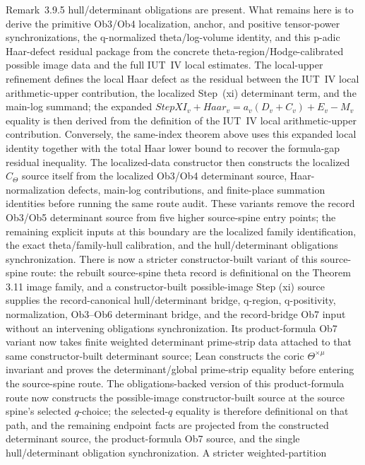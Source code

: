 \documentclass[11pt]{article}
\theoremstyle{plain}
\theoremstyle{definition}
\theoremstyle{remark}
\begin{document}
Remark~3.9.5 hull/determinant obligations are present.
What remains here is to derive the primitive Ob3/Ob4 localization,
anchor, and positive tensor-power synchronizations, the q-normalized
theta/log-volume identity, and this p-adic Haar-defect residual package from
the concrete theta-region/Hodge-calibrated possible image data and the full
IUT~IV local estimates.
The
local-upper refinement defines the local Haar defect as the residual between
the IUT~IV local arithmetic-upper contribution, the localized Step~(xi)
determinant term, and the main-log summand; the expanded
\(StepXI_v+Haar_v=a_v(D_v+C_v)+E_v-M_v\) equality is then derived from the
definition of the IUT~IV local arithmetic-upper contribution.  Conversely, the
same-index theorem above uses this expanded local identity together with the
total Haar lower bound to recover the formula-gap residual inequality.
The localized-data
constructor then constructs the localized \(C_\Theta\) source itself from the
localized Ob3/Ob4 determinant source, Haar-normalization defects, main-log
contributions, and finite-place summation identities before running the same
route audit.
These variants remove the record Ob3/Ob5 determinant source from five higher
source-spine entry points; the remaining explicit inputs at this boundary are
the localized family identification, the exact theta/family-hull calibration,
and the hull/determinant obligations synchronization.
There is now a stricter constructor-built variant of this source-spine route:
the rebuilt source-spine theta record is definitional on the Theorem 3.11 image
family, and a constructor-built possible-image Step (xi) source supplies the
record-canonical hull/determinant bridge, q-region, q-positivity,
normalization, Ob3--Ob6 determinant bridge, and the record-bridge Ob7 input
without an intervening obligations synchronization.  Its product-formula Ob7
variant now takes finite weighted determinant prime-strip data attached to that
same constructor-built determinant source; Lean constructs the coric
\(\Theta^{\times\mu}\) invariant and proves the determinant/global prime-strip
equality before entering the source-spine route.  The obligations-backed
version of this product-formula route now constructs the possible-image
constructor-built source at the source spine's selected \(q\)-choice; the
selected-\(q\) equality is therefore definitional on that path, and the
remaining endpoint facts are projected from the constructed determinant source,
the product-formula Ob7 source, and the single hull/determinant obligation
synchronization.  A stricter weighted-partition
\end{document}
